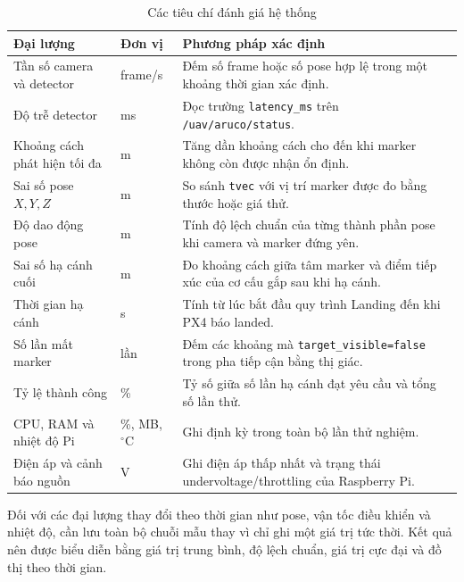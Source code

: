 \begin{table}[H]
    \centering
    \small
    \caption{Các tiêu chí đánh giá hệ thống}
    \label{tab:evaluation_metrics}
    \begin{tabularx}{\textwidth}{>{\raggedright\arraybackslash}p{} >{\raggedright\arraybackslash}p{} X}
        \toprule
        \textbf{Đại lượng} & \textbf{Đơn vị} & \textbf{Phương pháp xác định} \\
        \midrule
        Tần số camera và detector & frame/s & Đếm số frame hoặc số pose hợp lệ trong một khoảng thời gian xác định. \\
        Độ trễ detector & ms & Đọc trường \texttt{latency\_ms} trên \texttt{/uav/aruco/status}. \\
        Khoảng cách phát hiện tối đa & m & Tăng dần khoảng cách cho đến khi marker không còn được nhận ổn định. \\
        Sai số pose $X,Y,Z$ & m & So sánh \texttt{tvec} với vị trí marker được đo bằng thước hoặc giá thử. \\
        Độ dao động pose & m & Tính độ lệch chuẩn của từng thành phần pose khi camera và marker đứng yên. \\
        Sai số hạ cánh cuối & m & Đo khoảng cách giữa tâm marker và điểm tiếp xúc của cơ cấu gắp sau khi hạ cánh. \\
        Thời gian hạ cánh & s & Tính từ lúc bắt đầu quy trình Landing đến khi PX4 báo landed. \\
        Số lần mất marker & lần & Đếm các khoảng mà \texttt{target\_visible=false} trong pha tiếp cận bằng thị giác. \\
        Tỷ lệ thành công & \% & Tỷ số giữa số lần hạ cánh đạt yêu cầu và tổng số lần thử. \\
        CPU, RAM và nhiệt độ Pi & \%, MB, $^\circ$C & Ghi định kỳ trong toàn bộ lần thử nghiệm. \\
        Điện áp và cảnh báo nguồn & V & Ghi điện áp thấp nhất và trạng thái undervoltage/throttling của Raspberry Pi. \\
        \bottomrule
    \end{tabularx}
\end{table}

Đối với các đại lượng thay đổi theo thời gian như pose, vận tốc điều khiển và nhiệt độ, cần lưu toàn bộ chuỗi mẫu thay vì chỉ ghi một giá trị tức thời. Kết quả nên được biểu diễn bằng giá trị trung bình, độ lệch chuẩn, giá trị cực đại và đồ thị theo thời gian.

